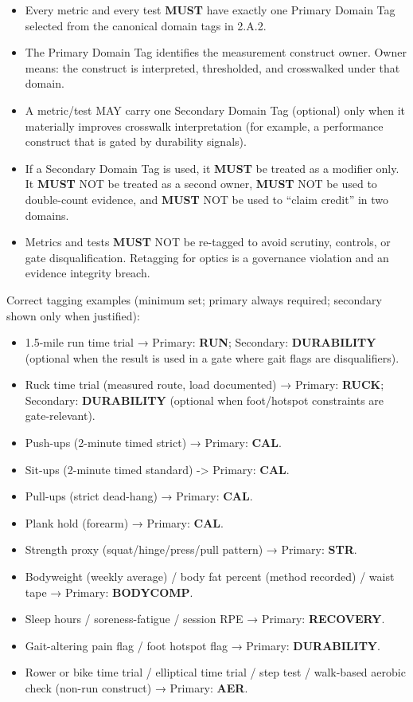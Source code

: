 \documentclass[10pt]{article}
\begin{document}
\begin{itemize}
\item Every metric and every test \textbf{MUST} have exactly one Primary Domain Tag selected from the canonical domain tags in 2.A.2.
\item The Primary Domain Tag identifies the measurement construct owner. Owner means: the construct is interpreted, thresholded, and crosswalked under that domain.
\item A metric/test MAY carry one Secondary Domain Tag (optional) only when it materially improves crosswalk interpretation (for example, a performance construct that is gated by durability signals).
\item If a Secondary Domain Tag is used, it \textbf{MUST} be treated as a modifier only. It \textbf{MUST} NOT be treated as a second owner, \textbf{MUST} NOT be used to double-count evidence, and \textbf{MUST} NOT be used to “claim credit” in two domains.
\item Metrics and tests \textbf{MUST} NOT be re-tagged to avoid scrutiny, controls, or gate disqualification. Retagging for optics is a governance violation and an evidence integrity breach.
\end{itemize}

Correct tagging examples (minimum set; primary always required; secondary shown only when justified):

\begin{itemize}
\item 1.5-mile run time trial → Primary: \textbf{RUN}; Secondary: \textbf{DURABILITY} (optional when the result is used in a gate where gait flags are disqualifiers).
\item Ruck time trial (measured route, load documented) → Primary: \textbf{RUCK}; Secondary: \textbf{DURABILITY} (optional when foot/hotspot constraints are gate-relevant).
\item Push-ups (2-minute timed strict) → Primary: \textbf{CAL}.
\item Sit-ups (2-minute timed standard) -> Primary: \textbf{CAL}.
\item Pull-ups (strict dead-hang) → Primary: \textbf{CAL}.
\item Plank hold (forearm) → Primary: \textbf{CAL}.
\item Strength proxy (squat/hinge/press/pull pattern) → Primary: \textbf{STR}.
\item Bodyweight (weekly average) / body fat percent (method recorded) / waist tape → Primary: \textbf{BODYCOMP}.
\item Sleep hours / soreness-fatigue / session RPE → Primary: \textbf{RECOVERY}.
\item Gait-altering pain flag / foot hotspot flag → Primary: \textbf{DURABILITY}.
\item Rower or bike time trial / elliptical time trial / step test / walk-based aerobic check (non-run construct) → Primary: \textbf{AER}.
\end{itemize}
\end{document}
